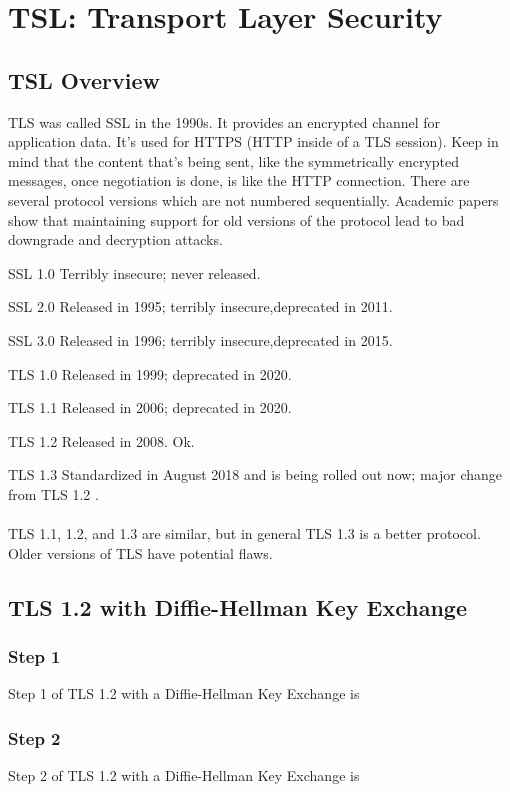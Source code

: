 \documentclass[11pt]{article} %
\begin{document}
{\newpage
\section{TSL: Transport Layer Security}

\subsection{TSL Overview}
 TLS was called SSL in the 1990s. It provides an encrypted channel for application data. It's used for HTTPS (HTTP inside of a TLS session). Keep in mind that the content that's being sent, like the symmetrically encrypted messages, once negotiation is done, is like the HTTP connection. There are several protocol versions which are not numbered sequentially. 
Academic papers show that maintaining support for old versions of the protocol lead to bad downgrade and decryption attacks.

\indent SSL 1.0 Terribly insecure; never released.

\indent SSL 2.0 Released in 1995; terribly insecure,deprecated in 2011.

\indent SSL 3.0  Released in 1996; terribly insecure,deprecated in 2015.


\indent TLS 1.0 Released in 1999; deprecated in 2020. 

\indent TLS 1.1 Released in 2006; deprecated in 2020.

\indent TLS 1.2 Released in 2008. Ok.

\indent TLS 1.3 Standardized in August 2018 and is being rolled out now;  major change\\
\indent from TLS 1.2 .
\\~\\
TLS 1.1, 1.2,  and 1.3 are similar, but in general TLS 1.3 is a better protocol. Older versions of TLS have potential flaws.

\newpage
\subsection{TLS 1.2 with Diffie-Hellman Key Exchange}

\subsubsection{Step 1}
Step 1 of TLS 1.2 with a Diffie-Hellman Key Exchange is 

\newpage
\subsubsection{Step 2}
Step 2 of TLS 1.2 with a Diffie-Hellman Key Exchange is 

}
\end{document}
